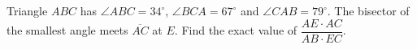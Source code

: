 Triangle $ABC$ has $\angle ABC=34^\circ$, $\angle BCA=67^\circ$ and $\angle CAB=79^\circ$. The bisector of the smallest angle meets $\overline{AC}$ at $E$. Find the exact value of $\dfrac{AE\cdot AC}{AB\cdot EC}$.
